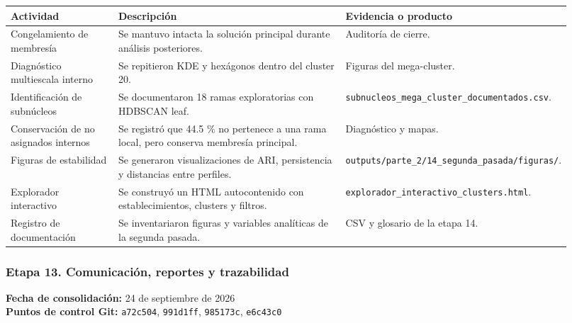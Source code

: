 \documentclass[
  spanish,
]{article}
\newcounter{none} %
\begin{document}
{\def\LTcaptype{none} %
\begin{longtable}[]{@{}p{0.20\linewidth}p{0.44\linewidth}p{0.28\linewidth}@{}}
\toprule\noalign{}
Actividad & Descripción & Evidencia o producto \\
\midrule\noalign{}
\endhead
\bottomrule\noalign{}
\endlastfoot
Congelamiento de membresía & Se mantuvo intacta la solución principal
durante análisis posteriores. & Auditoría de cierre. \\
Diagnóstico multiescala interno & Se repitieron KDE y hexágonos dentro
del cluster 20. & Figuras del mega-cluster. \\
Identificación de subnúcleos & Se documentaron 18 ramas exploratorias
con HDBSCAN leaf. &
\texttt{subnucleos\_mega\_cluster\_documentados.csv}. \\
Conservación de no asignados internos & Se registró que 44.5 \% no
pertenece a una rama local, pero conserva membresía principal. &
Diagnóstico y mapas. \\
Figuras de estabilidad & Se generaron visualizaciones de ARI,
persistencia y distancias entre perfiles. &
\texttt{outputs/parte\_2/14\_segunda\_pasada/figuras/}. \\
Explorador interactivo & Se construyó un HTML autocontenido con
establecimientos, clusters y filtros. &
\texttt{explorador\_interactivo\_clusters.html}. \\
Registro de documentación & Se inventariaron figuras y variables
analíticas de la segunda pasada. & CSV y glosario de la etapa 14. \\
\end{longtable}
}

\subsubsection{Etapa 13. Comunicación, reportes y
trazabilidad}\label{etapa-13-comunicaciuxf3n-reportes-y-trazabilidad}

\textbf{Fecha de consolidación:} 24 de septiembre de 2026\\
\textbf{Puntos de control Git:} \texttt{a72c504}, \texttt{991d1ff},
\texttt{985173c}, \texttt{e6c43c0}
\end{document}
